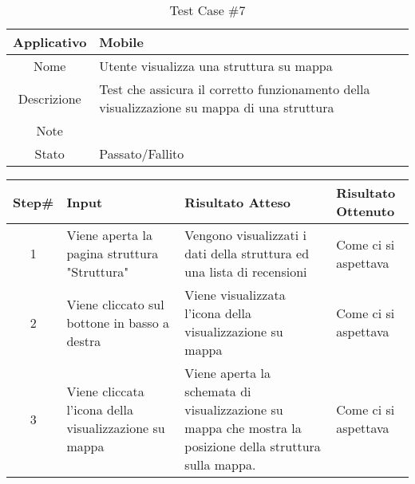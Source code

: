 
\begin{table}[H]
    \centering
    \footnotesize
    \caption{Test Case \#7}
    \begin{tabularx}{\textwidth}{|c|X|}
        \hline
        Applicativo & Mobile\\
        \hline
        Nome & Utente visualizza una struttura su mappa  \\
        \hline
        Descrizione & Test che assicura il corretto funzionamento della visualizzazione su mappa di una struttura\\
        \hline
        Note & \\
        \hline
        Stato & Passato/Fallito\\
        \hline

    \end{tabularx}
    \setlength{\tabcolsep}{8pt}
    \renewcommand{\arraystretch}{1.5}
\end{table}

\begin{table}[H]
    \footnotesize
    \begin{tabularx}{\textwidth}{|c|X|X|X|}
        \hline
        Step\# & Input & Risultato Atteso & Risultato Ottenuto \\
        \hline
         1 & Viene aperta la pagina struttura "Struttura"
         & Vengono visualizzati i dati della struttura ed una lista di recensioni
         &Come ci si aspettava \\
          \hline
        2 & Viene cliccato sul bottone in basso a destra
        & Viene visualizzata l'icona della visualizzazione su mappa
        & Come ci si aspettava\\
        3 & Viene cliccata l'icona della visualizzazione su mappa
        & Viene aperta la schemata di visualizzazione su mappa che mostra la posizione della struttura sulla mappa.
        & Come ci si aspettava\\
\hline
    \end{tabularx}
\end{table}
    
       
